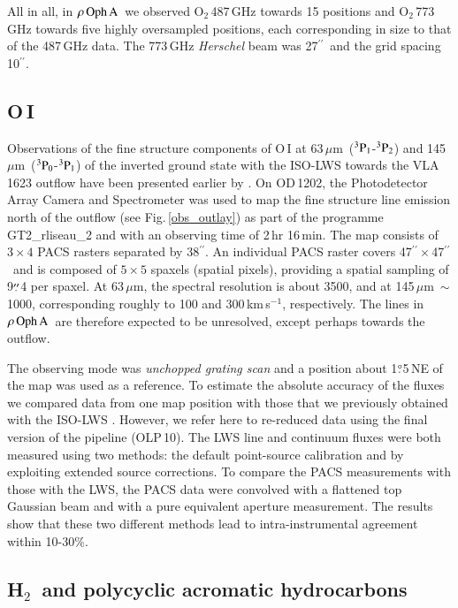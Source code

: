 \documentclass{aa}
\newcommand{\kms}{km\,s$^{-1}$}       %
\newcommand{\um}{$\mu$m}                                 %
\newcommand{\molh}{H$_{2}$}                              %
\newcommand{\molo}{O$_{2}$}                     %
\newcommand{\about}{$\sim$}                       %
\newcommand{\pzero}{$^{3}{\rm P}_{0}$}
\newcommand{\pone}{$^{3}{\rm P}_{1}$}
\newcommand{\ptwo}{$^{3}{\rm P}_{2}$}
\newcommand{\roa}{$\rho \, {\rm Oph \, A}$}
\newcommand{\asec}{$^{\prime \prime}$}
\newcommand{\adegdot}[2]{\mbox{#1$\stackrel {\circ}{_{\bf \cdot}}$#2}}
\newcommand{\asecdot}[2]{\mbox{#1$\stackrel {\prime \prime}{_{\bf \cdot}}$#2}}
\begin{document}
All in all, in \roa\ we observed \molo\,487\,GHz towards 15 positions and \molo\,773\,GHz towards five highly oversampled positions, each corresponding in size to that of the 487\,GHz data. The 773\,GHz {\it Herschel} beam  was 27\asec\ and the grid spacing 10\asec.

\subsection{\rm O\,I}

Observations of the fine structure components of O\,I at 63\,\um\ (\pone-\ptwo) and 145\,\um\, (\pzero-\pone) of the inverted ground state with the ISO-LWS \citep[Long Wavelength Spectrometer,][]{clegg1996} towards the VLA\,1623 outflow have been presented earlier by \citet{liseau2009}. On OD\,1202, the Photodetector Array Camera and Spectrometer \citep[PACS,][]{poglitsch2010} was used to map the fine structure line emission north of the outflow (see Fig.\,\ref{obs_outlay}) as part of the programme GT2\_rliseau\_2 and with an observing time of 2\,hr 16\,min. The map consists of $3 \times 4$ PACS rasters separated by 38\asec. An individual PACS raster covers 47\asec\,$\times$\,47\asec\ and is composed of $5\times 5$ spaxels (spatial pixels), providing a spatial sampling of \asecdot{9}{4} per spaxel. At 63\,\um, the spectral resolution is about 3500, and at 145\,\um\ \about\,1000, corresponding roughly to 100 and 300\,\kms, respectively. The lines in \roa\ are therefore expected to be unresolved, except perhaps towards the outflow. 

The observing mode was {\it unchopped grating scan} and a position about \adegdot{1}{5}\,NE of the map was used as a reference. To estimate the absolute accuracy of the fluxes we compared data from one map position with those that we previously obtained with the ISO-LWS  \citep[e.g.][]{liseau2009}. However, we refer here to re-reduced data using the final version of the pipeline (OLP\,10). The LWS line and continuum fluxes were both measured using two methods:   the default point-source calibration and  by exploiting extended source corrections. To compare the PACS measurements with those with the LWS, the PACS data were  convolved with a flattened top Gaussian beam \citep{larsson2000} and with a pure equivalent aperture measurement. The results show that these two different methods lead to intra-instrumental agreement within 10-30\%.

\subsection{\rm \molh\ and polycyclic acromatic hydrocarbons}
\end{document}
